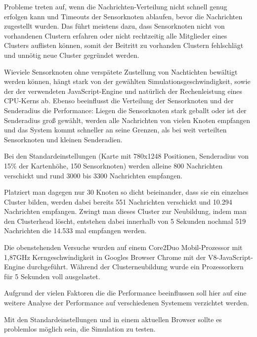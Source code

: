 Probleme treten auf, wenn die Nachrichten-Verteilung nicht schnell genug
erfolgen kann und Timeouts der Sensorknoten ablaufen, bevor die
Nachrichten zugestellt wurden. Das führt meistens dazu, dass
Sensorknoten nicht von vorhandenen Clustern erfahren oder nicht
rechtzeitig alle Mitglieder eines Clusters auflisten können, somit der
Beitritt zu vorhanden Clustern fehlschlägt und unnötig neue Cluster
gegründet werden.

Wieviele Sensorknoten ohne verspätete Zustellung von Nachtichten
bewältigt werden können, hängt stark von der gewählten
Simulationsgeschwindigkeit, sowie der der verwendeten JavaScript-Engine
und natürlich der Rechenleistung eines CPU-Kerns ab. Ebenso beeinflusst
die Verteilung der Sensorknoten und der Senderadius die Performance:
Liegen die Sensorknoten stark geballt oder ist der Senderadius groß
gewählt, werden alle Nachrichten von vielen Knoten empfangen und das
System kommt schneller an seine Grenzen, als bei weit verteilten
Sensorknoten und kleinen Senderadien.

Bei den Standardeinstellungen (Karte mit 780x1248 Positionen,
Senderadius von 15\% der Kartenhöhe, 150 Sensorknoten) werden alleine
800 Nachrichten verschickt und rund 3000 bis 3300 Nachrichten empfangen.

Platziert man dagegen nur 30 Knoten so dicht beieinander, dass sie ein
einzelnes Cluster bilden, werden dabei bereits 551 Nachrichten
verschickt und 10.294 Nachrichten empfangen. Zwingt man dieses Cluster
zur Neubildung, indem man den Clusterhead löscht, entstehen dabei
innerhalb von 5 Sekunden nochmal 519 Nachrichten die 14.533 mal
empfangen werden.

Die obenstehenden Versuche wurden auf einem Core2Duo Mobil-Prozessor mit
1,87GHz Kerngeschwindigkeit in Googles Browser Chrome mit der
V8-JavaScript-Engine durchgeführt. Während der Clusterneubildung wurde
ein Prozessorkern für 5 Sekunden voll ausgelastet.

Aufgrund der vielen Faktoren die die Performance beeinflussen soll hier
auf eine weitere Analyse der Performance auf verschiedenen Systemem
verzichtet werden.

Mit den Standardeinstellungen und in einem aktuellen Browser sollte es
problemlos möglich sein, die Simulation zu testen.
